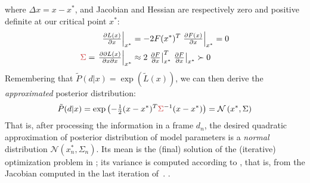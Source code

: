 %
where $\Delta x=x - x^*$, and Jacobian and Hessian are respectively zero and positive definite at our critical point $x^*$:
%
\begin{align}
\left.\tfrac{\partial L(x)}{\partial x} \right|_{x^*} &= - 2 F(x^*)^T 
\left.\tfrac{\partial F(x)}{\partial x}\right|_{x^*} = 0 
\label{eq:taylor-jacobian}
\\
\todo{\Sigma} = \left. \tfrac{\partial \partial L(x)}{\partial x \partial x}  \right|_{x^*}  
& \approx 2
\left.\tfrac{\partial F}{\partial x}\right|_{x^*}^T  
\left.\tfrac{\partial F}{\partial x}\right|_{x^*}
\succ 0
\label{eq:taylor-hessian}
\end{align}
% 
Remembering that $\tilde P(d|x) = \exp (\tilde{L}(x))$, we can then derive the \emph{approximated} posterior distribution:
%
\begin{align}
\tilde{P}(d|x) = \exp\left(- \tfrac{1}{2}(x - x^*)^T \todo{\Sigma}^{-1}  (x - x^*) \right) = \mathcal{N}\left(\star{x}, \Sigma \right)
\end{align}
%
That is, after processing the information in a frame $d_n$, the desired quadratic approximation of posterior distribution of model parameters is a \emph{normal} distribution $\mathcal{N}\left(x_n^*, \Sigma_n \right)$.
Its mean is the (final) solution of the (iterative) optimization problem in ; its variance is computed according to , that is, from the Jacobian computed in the last iteration of~. .


